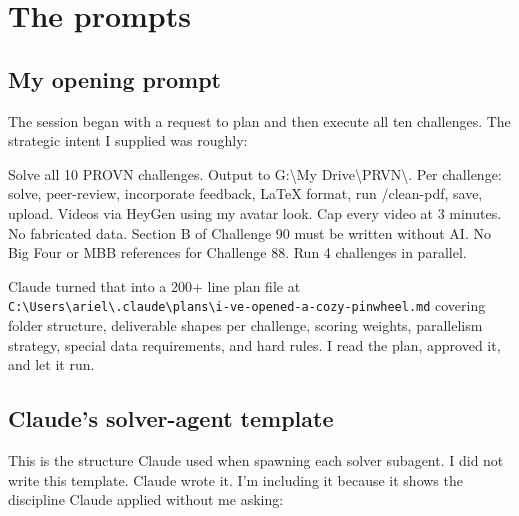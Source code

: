 \documentclass[12pt, letterpaper]{article}
\newenvironment{userquote}{%
    \begin{tcolorbox}[colback=quotebg, colframe=quoteborder,
        title={\textsc{Ariel, in-session}}, fonttitle=\bfseries\small,
        coltitle=quoteborder]
    \itshape
}{%
    \end{tcolorbox}
}
\begin{document}
\section{The prompts}

\subsection{My opening prompt}

The session began with a request to plan and then execute all ten challenges. The strategic intent I supplied was roughly:

\begin{userquote}
Solve all 10 PROVN challenges. Output to G:\textbackslash{}My Drive\textbackslash{}PRVN\textbackslash{}. Per challenge: solve, peer-review, incorporate feedback, LaTeX format, run /clean-pdf, save, upload. Videos via HeyGen using my avatar look. Cap every video at 3 minutes. No fabricated data. Section B of Challenge 90 must be written without AI. No Big Four or MBB references for Challenge 88. Run 4 challenges in parallel.
\end{userquote}

Claude turned that into a 200+ line plan file at \texttt{C:\textbackslash{}Users\textbackslash{}ariel\textbackslash{}.claude\textbackslash{}plans\textbackslash{}i-ve-opened-a-cozy-pinwheel.md} covering folder structure, deliverable shapes per challenge, scoring weights, parallelism strategy, special data requirements, and hard rules. I read the plan, approved it, and let it run.

\subsection{Claude's solver-agent template}

This is the structure Claude used when spawning each solver subagent. I did not write this template. Claude wrote it. I'm including it because it shows the discipline Claude applied without me asking:
\end{document}
